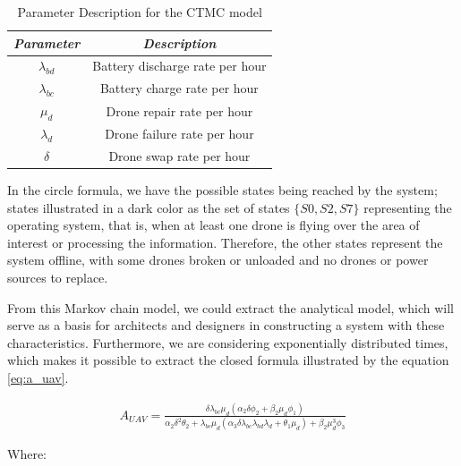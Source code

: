 \documentclass[conference]{IEEEtran}
\begin{document}
\begin{table}[htbp]
\caption{Parameter Description for the CTMC model}
\begin{center}
\begin{tabular}{c|c}
\hline
\textbf{\textit{Parameter}}& \textbf{\textit{Description}} \\
\hline
\hline
  \(\lambda_{bd}\) & Battery discharge rate per hour \\
  \(\lambda_{bc}\)  & Battery charge rate per hour\\
 \(\mu_{d}\) & Drone repair rate per hour  \\
 \(\lambda_{d}\) & Drone failure rate per hour \\
 \(\delta\) & Drone swap rate per hour \\
\hline
\end{tabular}
\label{tab:ctmc_parameter_description}
\end{center}
\end{table}

In the circle formula, we have the possible states being reached by the system; states illustrated in a dark color as the set of states $\{S0, S2, S7\}$ representing the operating system, that is, when at least one drone is flying over the area of interest or processing the information. Therefore, the other states represent the system offline, with some drones broken or unloaded and no drones or power sources to replace.

From this Markov chain model, we could extract the analytical model, which will serve as a basis for architects and designers in constructing a system with these characteristics. Furthermore, we are considering exponentially distributed times, which makes it possible to extract the closed formula illustrated by the equation \ref{eq:a_uav}.

\begin{align}\label{eq:a_uav}
A_{UAV} = \frac{\delta  \lambda_{bc} \mu_{d} (\alpha_{2} \delta \phi_{2} + \beta_{2} \mu_{d} \phi_{1})}{ \alpha_{2} \delta^{2} \theta_{2} + \lambda_{bc} \mu_{d} (\alpha_{3} \delta  \lambda_{bc} \lambda_{bd} \lambda_{d} + \theta_{1} \mu_{d})+ \beta_{2} \mu_{d}^{3} \phi_{3}}
\end{align}

Where: \\
\end{document}
